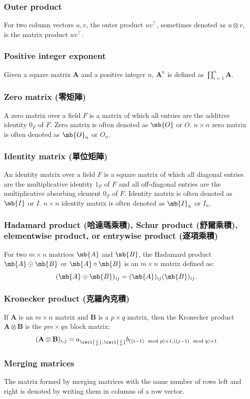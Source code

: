 \documentclass[a4paper,12pt]{report}
\begin{document}
\subsubsection{Outer product}
For two column vectors $u,v$, the outer product $uv^\top$, sometimes denoted as $u\otimes v$, is the matrix product $uv^\top$.
\subsubsection{Positive integer exponent}
Given a square matrix $\mathbf{A}$ and a positive integer $n$, $\mathbf{A}^n$ is defined as $\prod_{i=1}^n\mathbf{A}$.
\subsubsection{Zero matrix (零矩陣)}
A zero matrix over a field $F$ is a matrix of which all entries are the additive identity $0_F$ of $F$. Zero matrix is often denoted as $\mb{O}$ or $O$. $n\times n$ zero matrix is often denoted as $\mb{O}_n$ or $O_n$.
\subsubsection{Identity matrix (單位矩陣)}
An identity matrix over a field $F$ is a square matrix of which all diagonal entries are the multiplicative identity $1_F$ of $F$ and all off-diagonal entries are the multiplicative absorbing element $0_F$ of $F$. Identity matrix is often denoted as $\mb{I}$ or $I$. $n\times n$ identity matrix is often denoted as $\mb{I}_n$ or $I_n$.
\subsubsection{Hadamard product (哈達瑪乘積), Schur product (舒爾乘積), elementwise product, or entrywise product (逐項乘積)}
For two $m\times n$ matrices $\mb{A}$ and $\mb{B}$, the Hadamard product $ \mb{A}\odot \mb{B}$ or $\mb{A}\circ \mb{B}$ is an $m\times n$ matrix defined as:
\[(\mb{A}\odot \mb{B})_{ij}=(\mb{A})_{ij}(\mb{B})_{ij}.\]
\subsubsection{Kronecker product (克羅內克積)}
If $\mathbf{A}$ is an $m\times n$ matrix and $\mathbf{B}$ is a $p\times q$ matrix, then the Kronecker product $\mathbf{A}\otimes\mathbf{B}$ is the $pm\times qn$ block matrix:
\[(\mathbf{A}\otimes\mathbf{B})_{i,j}=a_{\ceil{\frac{i}{p}},\ceil{\frac{j}{q}}}b_{((i-1)\mod p)+1,((j-1)\mod q)+1}\]
\subsubsection{Merging matrices}
The matrix formed by merging matrices with the same number of rows left and right is denoted by writing them in columns of a row vector.
\end{document}
